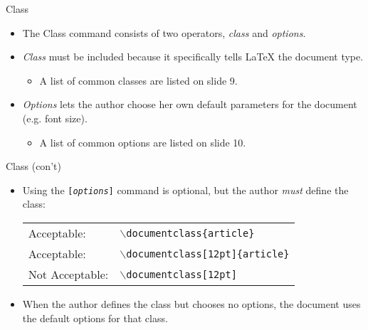 \documentclass[pdf]{prosper}
\begin{document}
\begin{slide}{Class}
	\begin{itemize}
		\item The Class command consists of two operators, \textit{class} and \textit{options}.
		\item \textit{Class} must be included because it specifically tells \LaTeX\mbox{} the document type.
			\begin{itemize}
				\item A list of common classes are listed on slide 9.
			\end{itemize}
		\item \textit{Options} lets the author choose her own default parameters for the document (e.g. font size).
			\begin{itemize}
				\item A list of common options are listed on slide 10.
			\end{itemize}
	\end{itemize}
\end{slide}
\begin{slide}{Class (con't)}
	\begin{itemize}
		\item Using the \texttt{[\textit{options}]} command is optional, but the author \emph{must} define the class:
			\begin{center}
				\begin{tabular}{l l}
					Acceptable: & \texttt{$\backslash$documentclass\{article\}} \\
					Acceptable: & \texttt{$\backslash$documentclass[12pt]\{article\}} \\
					Not Acceptable: & \texttt{$\backslash$documentclass[12pt]}
				\end{tabular}
			\end{center}
		\item When the author defines the class but chooses no options, the document uses the default options for that class.
	\end{itemize}
\end{slide}
\end{document}
